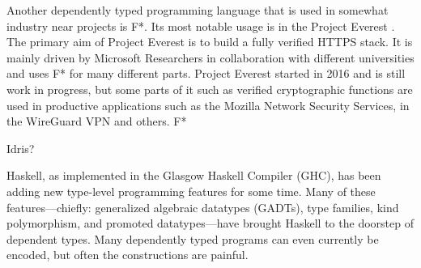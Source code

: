 Another dependently typed programming language that is used in somewhat industry near projects is F*. 
Its most notable usage is in the Project Everest \cite{project_everest_github_io}. The primary aim of Project Everest is to build a fully verified HTTPS stack.
It is mainly driven by Microsoft Researchers in collaboration with different universities and uses F* for many different parts.
Project Everest started in 2016 and is still work in progress, but some parts of it such as verified cryptographic functions are used in productive applications such as the Mozilla Network Security Services\cite{project_everest_slides},  in the WireGuard VPN and others. 
F* 

Idris?

Haskell, as implemented in the Glasgow Haskell Compiler (GHC), has been adding new type-level programming features for some time. Many of these features---chiefly: generalized algebraic datatypes (GADTs), type families, kind polymorphism, and promoted datatypes---have brought Haskell to the doorstep of dependent types. Many dependently typed programs can even currently be encoded, but often the constructions are painful. \cite{DBLP:journals/corr/Eisenberg16}
